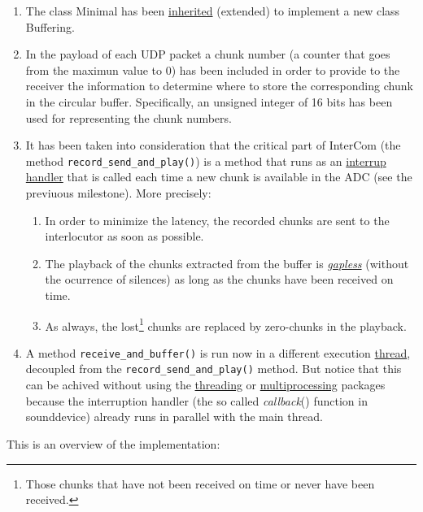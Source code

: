 \begin{enumerate}
\item The class Minimal has been
  \href{https://en.wikipedia.org/wiki/Inheritance_(object-oriented_programming)}{inherited}
  (extended) to implement a new class Buffering.
\item In the payload of each UDP packet a chunk number (a counter that
  goes from the maximun value to 0) has been included in order to
  provide to the receiver the information to determine where to store
  the corresponding chunk in the circular buffer. Specifically, an
  unsigned integer of 16 bits has been used for representing the chunk
  numbers.
\item It has been taken into consideration that the critical part of
  InterCom (the method \verb|record_send_and_play()|) is a method that
  runs as an
  \href{https://en.wikipedia.org/wiki/Interrupt_handler}{interrup
    handler} that is called each time a new chunk is available
  in the ADC (see the previuous milestone). More precisely:
  \begin{enumerate}
  \item In order to minimize the latency, the recorded chunks are sent
    to the interlocutor as soon as possible.
  \item The playback of the chunks extracted from the buffer is
    \href{https://en.wikipedia.org/wiki/Gapless_playback}{\emph{gapless}}
    (without the ocurrence of silences) as long as the chunks have
    been received on time.
  \item As always, the lost\footnote{Those chunks that have not been
  received on time or never have been received.} chunks are replaced
    by zero-chunks in the playback.
  \end{enumerate}
\item A method \verb|receive_and_buffer()| is run now in a different
  execution
  \href{https://en.wikipedia.org/wiki/Thread_(computing)}{thread},
  decoupled from the \verb|record_send_and_play()| method. But notice
  that this can be achived without using the
  \href{https://docs.python.org/3/library/threading.html}{threading}
  or
  \href{https://docs.python.org/3/library/multiprocessing.html}{multiprocessing}
  packages because the interruption handler (the so called
  \emph{callback}() function in sounddevice) already runs in parallel
  with the main thread.
\end{enumerate}

This is an overview of the implementation:

